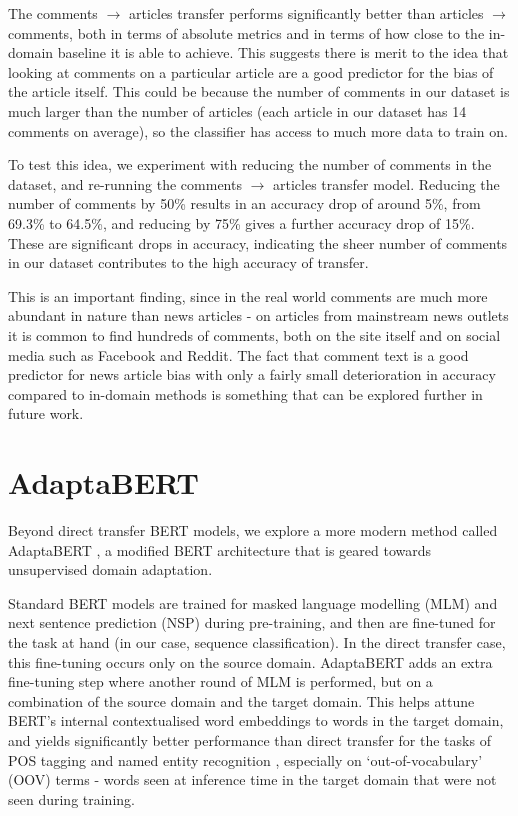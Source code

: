 The comments $ \rightarrow $ articles transfer performs significantly better than articles $ \rightarrow $ comments, both in terms of absolute metrics and in terms of how close to the in-domain baseline it is able to achieve. This suggests there is merit to the idea that looking at comments on a particular article are a good predictor for the bias of the article itself. This could be because the number of comments in our dataset is much larger than the number of articles (each article in our dataset has 14 comments on average), so the classifier has access to much more data to train on.

To test this idea, we experiment with reducing the number of comments in the dataset, and re-running the comments $ \rightarrow $ articles transfer model. Reducing the number of comments by 50\% results in an accuracy drop of around 5\%, from 69.3\% to 64.5\%, and reducing by 75\% gives a further accuracy drop of 15\%. These are significant drops in accuracy, indicating the sheer number of comments in our dataset contributes to the high accuracy of transfer.

This is an important finding, since in the real world comments are much more abundant in nature than news articles - on articles from mainstream news outlets it is common to find hundreds of comments, both on the site itself and on social media such as Facebook and Reddit. The fact that comment text is a good predictor for news article bias with only a fairly small deterioration in accuracy compared to in-domain methods is something that can be explored further in future work.

\section{AdaptaBERT} \label{sec:adaptabert}

Beyond direct transfer BERT models, we explore a more modern method called AdaptaBERT \cite{adaptabert}, a modified BERT architecture that is geared towards unsupervised domain adaptation.

Standard BERT models are trained for masked language modelling (MLM) and next sentence prediction (NSP) during pre-training, and then are fine-tuned for the task at hand (in our case, sequence classification). In the direct transfer case, this fine-tuning occurs only on the source domain. AdaptaBERT adds an extra fine-tuning step where another round of MLM is performed, but on a combination of the source domain and the target domain. This helps attune BERT's internal contextualised word embeddings to words in the target domain, and yields significantly better performance than direct transfer for the tasks of POS tagging and named entity recognition \cite{adaptabert}, especially on `out-of-vocabulary' (OOV) terms - words seen at inference time in the target domain that were not seen during training.

